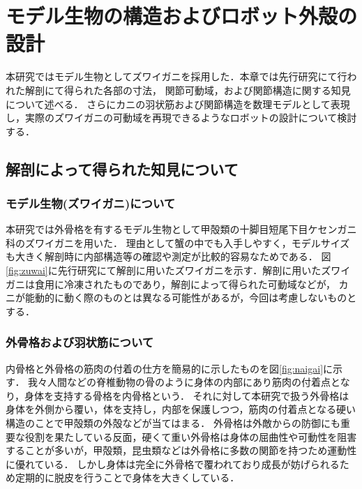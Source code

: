 \newpage
\section{モデル生物の構造およびロボット外殻の設計}
本研究ではモデル生物としてズワイガニを採用した．本章では先行研究\cite{hasegawa}にて行われた解剖にて得られた各部の寸法，
関節可動域，および関節構造に関する知見について述べる．
さらにカニの羽状筋および関節構造を数理モデルとして表現し，実際のズワイガニの可動域を再現できるようなロボットの設計について検討する．
\subsection{解剖によって得られた知見について}
\subsubsection{モデル生物(ズワイガニ)について}
本研究では外骨格を有するモデル生物として甲殻類の十脚目短尾下目ケセンガニ科のズワイガニを用いた．
理由として蟹の中でも入手しやすく，モデルサイズも大きく解剖時に内部構造等の確認や測定が比較的容易なためである．
図\ref{fig:zuwai}に先行研究にて解剖に用いたズワイガニを示す．解剖に用いたズワイガニは食用に冷凍されたものであり，解剖によって得られた可動域などが，
カニが能動的に動く際のものとは異なる可能性があるが，今回は考慮しないものとする．
\subsubsection{外骨格および羽状筋について}
内骨格と外骨格の筋肉の付着の仕方を簡易的に示したものを図\ref{fig:naigai}に示す．
我々人間などの脊椎動物の骨のように身体の内部にあり筋肉の付着点となり，身体を支持する骨格を内骨格という．
それに対して本研究で扱う外骨格は身体を外側から覆い，体を支持し，内部を保護しつつ，筋肉の付着点となる硬い構造のことで甲殻類の外殻などが当てはまる．
外骨格は外敵からの防御にも重要な役割を果たしている反面，硬くて重い外骨格は身体の屈曲性や可動性を阻害することが多いが，甲殻類，昆虫類などは外骨格に多数の関節を持つため運動性に優れている．
しかし身体は完全に外骨格で覆われており成長が妨げられるため定期的に脱皮を行うことで身体を大きくしている．

